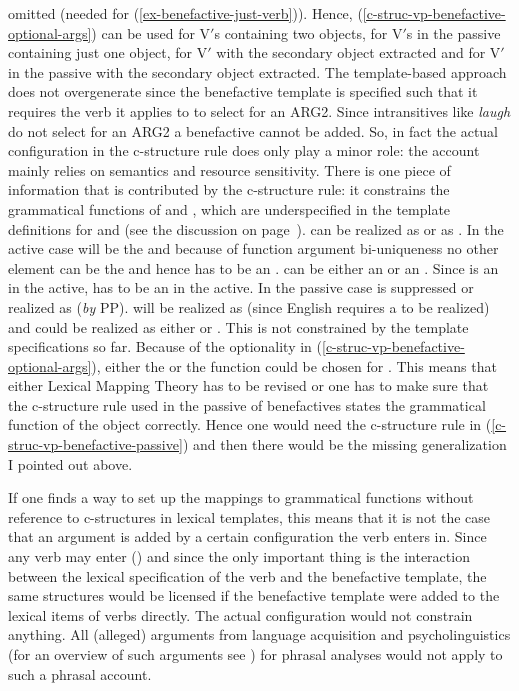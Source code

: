 omitted (needed for (\ref{ex-benefactive-just-verb})). Hence,
(\ref{c-struc-vp-benefactive-optional-args}) can be used for V$'$s containing two objects, for V$'$s
in the passive containing just one object, for V$'$ with the secondary object extracted and for V$'$
in the passive with the secondary object extracted. The template-based approach does not
overgenerate since the benefactive template is specified such that it requires the verb it applies
to to select for an ARG2. Since intransitives like \emph{laugh} do not select for an ARG2 a
benefactive cannot be added. So, in fact the actual configuration in the c-structure rule does only
play a minor role: the account mainly relies on semantics and resource sensitivity. There is one
piece of information that is contributed by the c-structure rule: it constrains the grammatical
functions of \argtwo and \argthree, which are underspecified in the template definitions for \argtwo
and \argthree (see the discussion on page~\pageref{page-disjunctions-gf-c-structure}). \argtwo can
be realized as \subj or as \obj. In the active case \argone will be the \subj and because of function argument bi-uniqueness \citep[]{BATW2015a} no other element can be the \subj and hence \argtwo has to
be an \obj. \argthree can be either an \obj or an \objtheta. Since \argtwo is an \obj in the active,
\argthree has to be an \objtheta in the active. In the passive case \argone is suppressed or
realized as \obltheta (\emph{by} PP). \argtwo will be realized as \subj (since English requires a \subj to be realized) and \argthree could be realized as either
\obj or \objtheta. This is not constrained by the template specifications so far. Because of the
optionality in (\ref{c-struc-vp-benefactive-optional-args}), either the \obj or the \objtheta
function could be chosen for \argthree. This means that either Lexical Mapping Theory has to be
revised or one has to make sure that the c-structure rule used in the passive of benefactives states the grammatical
function of the object correctly. Hence one would need the c-structure rule in
(\ref{c-struc-vp-benefactive-passive}) and then there would be the missing generalization I pointed
out above.

If one finds a way to set up the mappings to grammatical functions without reference to c-structures
in lexical templates, this means that it is not the case that an argument is added by
a certain configuration the verb enters in. Since any verb may enter () and since the only
important thing is the interaction between the lexical specification of the verb and the benefactive
template, the same structures would be licensed if the benefactive template were added to the
lexical items of verbs directly. The actual configuration would not constrain anything. All (alleged) arguments
from language acquisition and psycholinguistics (for an overview of such arguments see ) for phrasal analyses would not apply to such a phrasal account.

